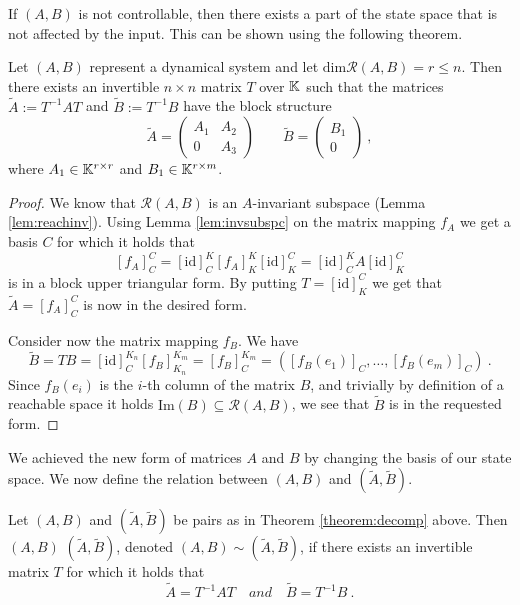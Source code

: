 If $(A,B)$ is not controllable, then there exists a part of the state space that is not affected by the input. This can be shown using the following theorem.

\begin{theorem}
	\label{theorem:decomp}
	Let $(A,B)$ represent a dynamical system and let $\text{dim}\mathcal{R}(A,B)=r\leq n$. Then there exists an invertible $n\times n$ matrix $T$ over $\mathbb{K}$ such that the matrices $\widetilde{A}:=T^{-1}AT$ and $\widetilde{B}:=T^{-1}B$ have the block structure 
	\begin{equation}
		\label{eq:decomp}
		\widetilde{A}=
		\begin{pmatrix}
			A_1 & A_2 \\
			0   & A_3 
		\end{pmatrix}
		\qquad
		\widetilde{B}=
		\begin{pmatrix}
			B_1  \\
			0
		\end{pmatrix}\ ,
	\end{equation}
	where $A_1\in\mathbb{K}^{r \times r}$ and $B_1\in\mathbb{K}^{r \times m}$.
\end{theorem}

\begin{proof}
	We know that $\mathcal{R}(A,B)$ is an $A$-invariant subspace (Lemma \ref{lem:reachinv}). Using Lemma \ref{lem:invsubspc} on the matrix mapping $f_A$ we get a basis $C$ for which it holds that 
	$$[f_A]^C_C=[\text{id}]^K_C[f_A]^K_K[\text{id}]^C_K=[\text{id}]^K_CA[\text{id}]^C_K$$ 
	is in a block upper triangular form. By putting $T=[\text{id}]^C_K$ we get that $\widetilde{A}=[f_A]^C_C$ is now in the desired form.

	Consider now the matrix mapping $f_B$. We have
	$$\widetilde{B}=TB=[\text{id}]^{K_n}_C[f_B]^{K_m}_{K_n}=[f_B]^{K_m}_C=([f_B(e_1)]_C,\ldots,[f_B(e_m)]_C)\ .$$
	Since $f_B(e_i)$ is the $i$-th column of the matrix $B$, and trivially by definition of a reachable space it holds $\text{Im}(B)\subseteq \mathcal{R}(A,B)$, we see that $\widetilde{B}$ is in the requested form.
\end{proof}

We achieved the new form of matrices $A$ and $B$ by changing the basis of our state space. We now define the relation between $(A,B)$ and $(\widetilde{A},\widetilde{B}).$

\begin{definition}
	Let $(A,B)$ and $(\widetilde{A},\widetilde{B})$ be pairs as in Theorem \ref{theorem:decomp} above. Then $(A,B)$  $(\widetilde{A},\widetilde{B})$, denoted $(A,B) \sim (\widetilde{A},\widetilde{B})$, if there exists an invertible matrix $T$ for which it holds that
	$$\widetilde{A}=T^{-1}AT\quad and\quad\widetilde{B}=T^{-1}B\ .$$
\end{definition}

